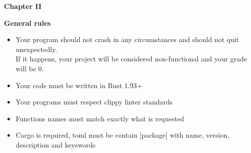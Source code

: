 % 


{\Large\bfseries Chapter II}

\vspace{0.8cm}

{\LARGE\bfseries General rules}

\vspace{0.5cm}

\begin{itemize}[leftmargin=1.5em, itemsep=0.8em]
    \item Your program should not crash in any circumstances and should not quit unexpectedly.\\
    If it happens, your project will be considered non-functional and your grade will be 0.
    \item Your code must be written in Rust 1.93+
    \item Your programs must respect clippy linter standards
    \item Functions names must match exactly what is requested
    \item Cargo is required, toml must be contain [package] with name, version, description and keyswords
\end{itemize}
